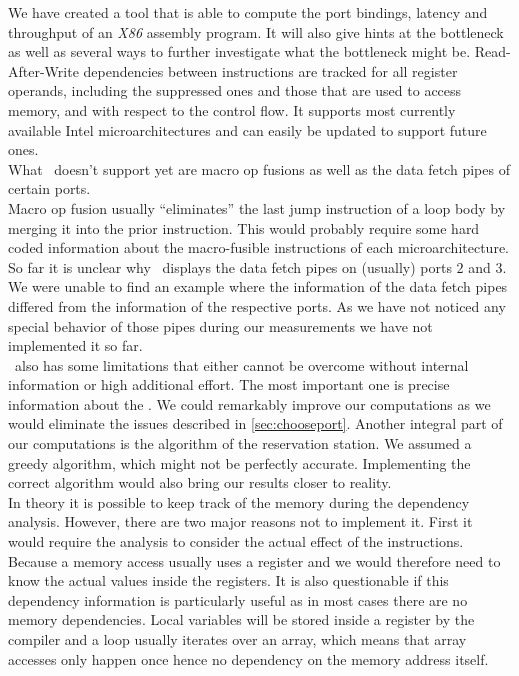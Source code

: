 
We have created a tool that is able to compute the port bindings, latency and throughput of an \emph{X86} assembly program. It will also give hints at the bottleneck as well as several ways to further investigate what the bottleneck might be. Read-After-Write dependencies between instructions are tracked for all register operands, including the suppressed ones and those that are used to access memory, and with respect to the control flow. It supports most currently available Intel microarchitectures and can easily be updated to support future ones.\\

What \suaca\ doesn't support yet are macro op fusions as well as the data fetch pipes of certain ports.\\
Macro op fusion usually ``eliminates'' the last jump instruction of a loop body by merging it into the prior instruction. This would probably require some hard coded information about the macro-fusible instructions of each microarchitecture.\\
So far it is unclear why \iaca\ displays the data fetch pipes on (usually) ports $2$ and $3$. We were unable to find an example where the information of the data fetch pipes differed from the information of the respective ports. As we have not noticed any special behavior of those pipes during our measurements we have not implemented it so far.\\

\suaca\ also has some limitations that either cannot be overcome without internal information or high additional effort.
The most important one is precise information about the \microops. We could remarkably improve our computations as we would eliminate the issues described in \autoref{sec:chooseport}. Another integral part of our computations is the algorithm of the reservation station. We assumed a greedy algorithm, which might not be perfectly accurate. Implementing the correct algorithm would also bring our results closer to reality.\\
In theory it is possible to keep track of the memory during the dependency analysis. However, there are two major reasons not to implement it. First it would require the analysis to consider the actual effect of the instructions. Because a memory access usually uses a register and we would therefore need to know the actual values inside the registers. It is also questionable if this dependency information is particularly useful as in most cases there are no memory dependencies. Local variables will be stored inside a register by the compiler and a loop usually iterates over an array, which means that array accesses only happen once hence no dependency on the memory address itself.
